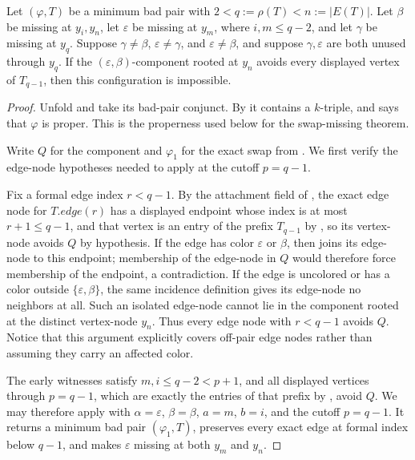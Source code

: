 \begin{helper}
Let \((\varphi,T)\) be a minimum bad pair with
\(2<q:=\rho(T)<n:=|E(T)|\).  Let \(\beta\) be missing at
\(y_i,y_n\), let \(\varepsilon\) be missing at \(y_m\), where
\(i,m\le q-2\), and let \(\gamma\) be missing at \(y_q\).  Suppose
\(\gamma\ne\beta\), \(\varepsilon\ne\gamma\), and
\(\varepsilon\ne\beta\), and suppose \(\gamma,\varepsilon\) are both
unused through \(y_q\).  If the \((\varepsilon,\beta)\)-component
rooted at \(y_n\) avoids every displayed vertex of \(T_{q-1}\), then
this configuration is impossible.
\end{helper}
\begin{proof}
Unfold  and take its bad-pair
conjunct.  By  it contains a \(k\)-triple, and
 says that \(\varphi\) is proper.  This is the
properness used below for the swap-missing theorem.

Write \(Q\) for the component and
\(\varphi_1\) for the exact swap from
.  We first verify the edge-node
hypotheses needed to apply
 at the cutoff
\(p=q-1\).

Fix a formal edge index \(r<q-1\).  By the attachment field of
, the exact edge node for \(T.edge(r)\) has a
displayed endpoint whose index is at most \(r+1\le q-1\), and that
vertex is an entry of the prefix \(T_{q-1}\) by
, so its vertex-node avoids \(Q\) by
hypothesis.  If the edge has color
\(\varepsilon\) or \(\beta\), then
 joins its edge-node to this endpoint;
membership of the edge-node in \(Q\) would therefore force membership
of the endpoint, a contradiction.  If the edge is uncolored or has a
color outside \(\{\varepsilon,\beta\}\), the same incidence definition
gives its edge-node no neighbors at all.  Such an isolated edge-node
cannot lie in the component  rooted at the
distinct vertex-node \(y_n\).  Thus every edge node with \(r<q-1\)
avoids \(Q\).  Notice that this argument explicitly covers off-pair
edge nodes rather than assuming they carry an affected color.

The early witnesses satisfy \(m,i\le q-2<p+1\), and all displayed
vertices through \(p=q-1\), which are exactly the entries of that
prefix by , avoid \(Q\).  We may therefore apply
 with
\(\alpha=\varepsilon\), \(\beta=\beta\), \(a=m\), \(b=i\), and the
cutoff \(p=q-1\).  It returns a minimum bad pair
\((\varphi_1,T)\), preserves every exact edge at formal index below
\(q-1\), and makes \(\varepsilon\) missing at both \(y_m\) and
\(y_n\).


\end{proof}
